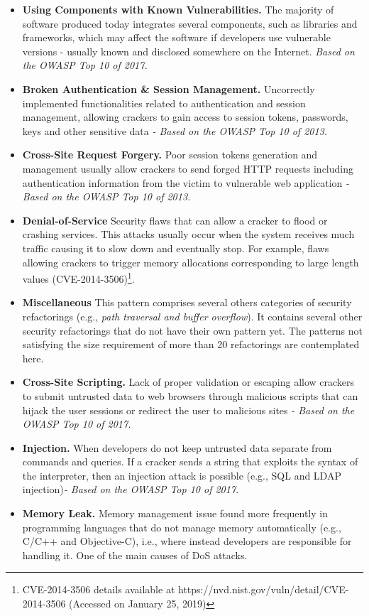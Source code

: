 \documentclass[10pt,conference]{IEEEtran}
\begin{document}
\begin{itemize}
	\item \textbf{Using Components with Known Vulnerabilities.} The majority of software produced today integrates several components, such as libraries and frameworks, which may affect the software if developers use vulnerable versions - usually known and disclosed somewhere on the Internet. \textit{Based on the OWASP Top 10 of 2017.}
	\item \textbf{Broken Authentication \& Session Management.} Uncorrectly implemented functionalities related to authentication and session management, allowing crackers to gain access to session tokens, passwords, keys and other sensitive data \textit{- Based on the OWASP Top 10 of 2013.}
	\item \textbf{Cross-Site Request Forgery.} Poor session tokens generation and management usually allow crackers to send forged HTTP requests including authentication information from the victim to vulnerable web application \textit{- Based on the OWASP Top 10 of 2013.}
	\item \textbf{Denial-of-Service} Security flaws that can allow a cracker to flood or crashing services. This attacks usually occur when the system receives much traffic causing it to slow down and eventually stop. For example, flaws allowing crackers to trigger memory allocations corresponding to large length values (CVE-2014-3506)\footnote{CVE-2014-3506 details available at https://nvd.nist.gov/vuln/detail/CVE-2014-3506 (Accessed on January 25, 2019)}. 
	\item \textbf{Miscellaneous} This pattern comprises several others categories of security refactorings (e.g., \textit{path traversal and buffer overflow}). It contains several other security refactorings that do not have their own pattern yet. The patterns not satisfying the size requirement of more than 20 refactorings are contemplated here.	
	\item \textbf{Cross-Site Scripting.} Lack of proper validation or escaping allow crackers to submit untrusted data to web browsers through malicious scripts that can hijack the user sessions or redirect the user to malicious sites \textit{- Based on the OWASP Top 10 of 2017.}
	\item \textbf{Injection.} When developers do not keep untrusted data separate from commands and queries. If a cracker sends a string that exploits the syntax of the interpreter, then an injection attack is possible (e.g., SQL and LDAP injection)\textit{- Based on the OWASP Top 10 of 2017.}
	\item \textbf{Memory Leak.} Memory management issue found more frequently in programming languages that do not manage memory automatically (e.g., C/C++ and Objective-C), i.e., where instead developers are responsible for handling it. One of the main causes of DoS attacks.
\end{itemize}
\end{document}
